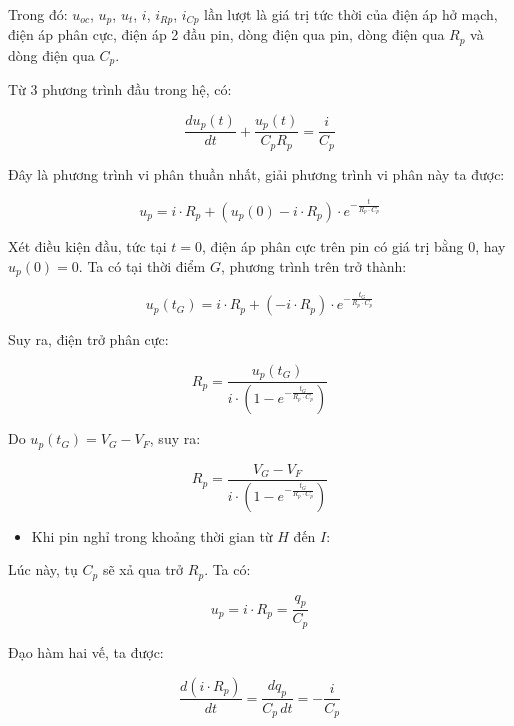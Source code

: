 \documentclass{thesis}
\begin{document}
    Trong đó: $u_{oc}$, $u_p$, $u_t$, $i$, $i_{Rp}$, $i_{Cp}$ lần lượt là giá trị tức thời của điện áp hở mạch, điện áp phân cực, điện áp 2 đầu pin, dòng điện qua pin, dòng điện qua $R_p$ và dòng điện qua $C_p$.

    Từ 3 phương trình đầu trong hệ, có:

    \begin{equation}
\frac{du_p(t)}{dt} + \frac{u_p(t)}{C_p R_p} = \frac{i}{C_p} 
\end{equation}


    Đây là phương trình vi phân thuần nhất, giải phương trình vi phân này ta được:

    \begin{equation}
u_p = i \cdot R_p + (u_p(0) - i \cdot R_p) \cdot e^{-\frac{t}{R_p \cdot C_p}} 
\end{equation}

    Xét điều kiện đầu, tức tại $t=0$, điện áp phân cực trên pin có giá trị bằng 0, hay $u_p(0) = 0$. Ta có tại thời điểm $G$, phương trình trên trở thành:

   \begin{equation}
u_p(t_G) = i \cdot R_p + (-i \cdot R_p) \cdot e^{-\frac{t_G}{R_p \cdot C_p}} 
\end{equation}

    Suy ra, điện trở phân cực:

    \begin{equation}
R_p = \frac{u_p(t_G)}{i \cdot (1 - e^{-\frac{t_G}{R_p \cdot C_p}})} 
\end{equation}

    Do \( u_p(t_G) = V_G - V_F \), suy ra:

    \begin{equation}
R_p = \frac{V_G - V_F}{i \cdot (1 - e^{-\frac{t_G}{R_p \cdot C_p}})} 
\end{equation}

\begin{itemize}
    \item Khi pin nghỉ trong khoảng thời gian từ \( H \) đến \( I \):
\end{itemize}

Lúc này, tụ \( C_p \) sẽ xả qua trở \( R_p \). Ta có:

\begin{equation}
u_p = i \cdot R_p = \frac{q_p}{C_p} 
\end{equation}

Đạo hàm hai vế, ta được:

\begin{equation}
\frac{d(i \cdot R_p)}{dt} = \frac{dq_p}{C_p \, dt} = -\frac{i}{C_p} 
\end{equation}
\end{document}
